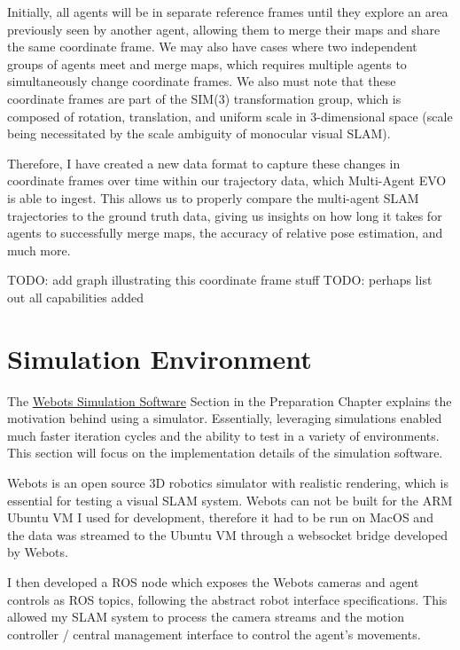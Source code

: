 Initially, all agents will be in separate reference frames until they explore an area previously seen by another agent, allowing them to merge their maps and share the same coordinate frame. We may also have cases where two independent groups of agents meet and merge maps, which requires multiple agents to simultaneously change coordinate frames. We also must note that these coordinate frames are part of the SIM(3) transformation group, which is composed of rotation, translation, and uniform scale in 3-dimensional space (scale being necessitated by the scale ambiguity of monocular visual SLAM).

Therefore, I have created a new data format to capture these changes in coordinate frames over time within our trajectory data, which Multi-Agent EVO is able to ingest. This allows us to properly compare the multi-agent SLAM trajectories to the ground truth data, giving us insights on how long it takes for agents to successfully merge maps, the accuracy of relative pose estimation, and much more.


TODO: add graph illustrating this coordinate frame stuff
TODO: perhaps list out all capabilities added

\section{Simulation Environment}
\label{sec:simulation-environment}
The \hyperref[sec:webots-simulator]{Webots Simulation Software} Section in the Preparation Chapter explains the motivation behind using a simulator. Essentially, leveraging simulations enabled much faster iteration cycles and the ability to test in a variety of environments. This section will focus on the implementation details of the simulation software.

Webots is an open source 3D robotics simulator with realistic rendering, which is essential for testing a visual SLAM system. Webots can not be built for the ARM Ubuntu VM I used for development, therefore it had to be run on MacOS and the data was streamed to the Ubuntu VM through a websocket bridge developed by Webots.

I then developed a ROS node which exposes the Webots cameras and agent controls as ROS topics, following the abstract robot interface specifications. This allowed my SLAM system to process the camera streams and the motion controller / central management interface to control the agent's movements.


